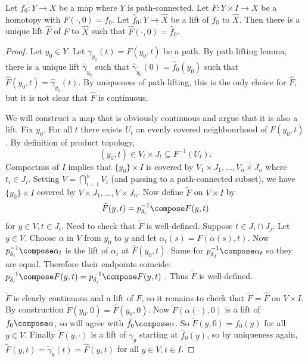 \documentclass[a4paper]{article}
\begin{document}
\begin{lemma}
  \label{lem:homotopy lifting lemma}
  Let \(f_0: Y \to X\) be a map where \(Y\) is path-connected. Let \(F: Y \times I \to X\) be a homotopy with \(F(\cdot, 0) = f_0\). Let \(\hat f_0: Y \to \hat X\) be a lift of \(f_0\) to \(\hat X\). Then there is a unique lift \(\hat F\) of \(F\) to \(\hat X\) such that \(\hat F(\cdot, 0) = \hat f_0\).
\end{lemma}

\begin{proof}
  Let \(y_0 \in Y\). Let \(\gamma_{y_0}(t) = F(y_0, t)\) be a path. By path lifting lemma, there is a unique lift \(\hat \gamma_{y_0}\) such that \(\hat \gamma_{y_0}(0) = \hat f_0(y_0)\) such that \(\hat F(y_0, t) = \hat\gamma_{y_0}(t)\). By uniqueness of path lifting, this is the only choice for \(\hat F\), but it is not clear that \(\hat F\) is continuous.

  We will construct a map that is obviously continuous and argue that it is also a lift. Fix \(y_0\). For all \(t\) there exists \(U_t\) an evenly covered neighbourhood of \(F(y_0, t)\). By definition of product topology,
  \[
    (y_0, t) \in V_t \times J_t \subseteq F^{-1}(U_t).
  \]
  Compactnss of \(I\) implies that \(\{y_0\} \times I\) is covered by \(V_1 \times J_1, \dots, V_n \times J_n\) where \(t_i \in J_i\). Setting \(V = \bigcap_{i = 1}^n V_i\) (and passing to a path-connected subset), we have \(\{y_0\} \times I\) covered by \(V \times J_1, \dots, V \times J_n\). Now define \(\tilde F\) on \(V \times I\) by
  \[
    \tilde F(y, t) = p_{\delta_i}^{-1} \compose F(y, t)
  \]
  for \(y \in V, t \in J_i\). Need to check that \(\tilde F\) is well-defined. Suppose \(t \in J_i \cap J_j\). Let \(y \in V\). Choose \(\alpha\) in \(V\) from \(y_0\) to \(y\) and let \(\alpha_t(s) = F(\alpha(s), t)\). Now \(p_{\delta_i}^{-1} \compose \alpha_t\) is the lift of \(\alpha_t\) at \(\hat F(y_0, t)\). Same for \(p_{\delta_j}^{-1} \compose \alpha_t\) so they are equal. Therefore their endpoints coincide: \(p_{\delta_i}^{-1} \compose F(y, t) = p_{\delta_j}^{-1} \compose F(y, t)\) . Thus \(\tilde F\) is well-defined.

  \(\tilde F\) is clearly continuous and a lift of \(F\), so it remains to check that \(\tilde F = \hat F\) on \(V \times I\). By construction \(\tilde F(y_0, 0) = \hat F(y_0, 0)\). Now \(\tilde F(\alpha(\cdot), 0)\) is a lift of \(f_0 \compose \alpha\), so will agree with \(\hat f_0 \compose \alpha\). So \(\tilde F(y, 0) = \hat f_0(y)\) for all \(y \in V\). Finally \(\tilde F(y, \cdot)\) is a lift of \(\gamma_y\) starting at \(\hat f_0(y)\), so by uniqueness again, \(\tilde F(y, t) = \tilde \gamma_y(t) = \hat F(y, t)\) for all \(y \in V, t \in I\).
\end{proof}
\end{document}
